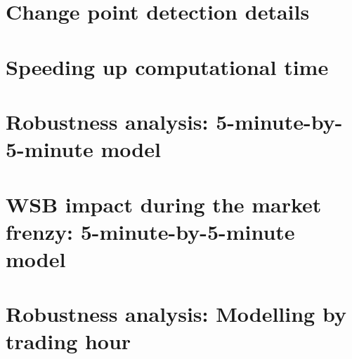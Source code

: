 \documentclass[11pt,a4paper,rorate,times]{article}
\begin{document}
\section{Change point detection details}
\label{app:cpdetails}


\section{Speeding up computational time}
\label{app:computation}


\section{Robustness analysis: 5-minute-by-5-minute model}
\label{app:5minby5min}


\section{WSB impact during the market frenzy: 5-minute-by-5-minute model}
\label{app:5minfin}


\section{Robustness analysis: Modelling by trading hour}
\label{app:app_modelbyhour}



\end{document}
